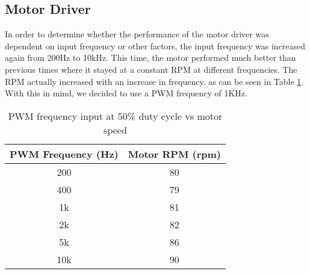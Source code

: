 \subsection{Motor Driver}
In order to determine whether the performance of the motor driver was dependent on input frequency or other factors, the input frequency was increased again from 200Hz to 10kHz. This time, the motor performed much better than previous times where it stayed at a constant RPM at different frequencies. The RPM actually increased with an increase in frequency, as can be seen in Table \ref{tbl:freq-test}. With this in mind, we decided to use a PWM frequency of 1KHz.
\begin{table}[H]
	\centering
	\caption{PWM frequency input at 50\% duty cycle vs motor speed}
	\begin{tabular}{| c | c |}
		\hline
		PWM Frequency (Hz) & Motor RPM (rpm) \\
		\hline
		200 & 80 \\
		400 & 79 \\
		1k & 81 \\
		2k & 82 \\
		5k & 86 \\
		10k & 90 \\
		\hline
	\end{tabular}
	\label{tbl:freq-test}
\end{table}


